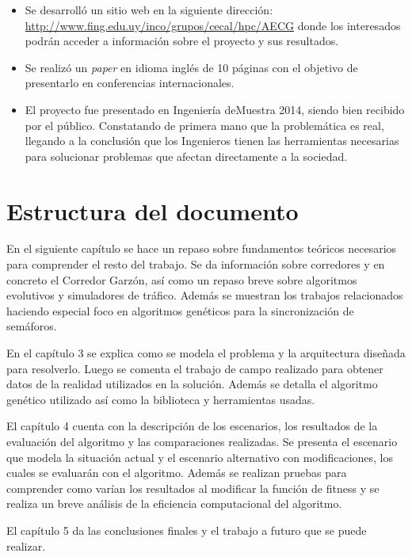 \begin{itemize}
	\item Se desarrolló un sitio web en la siguiente dirección: \url{http://www.fing.edu.uy/inco/grupos/cecal/hpc/AECG} donde los interesados podrán acceder a información sobre el proyecto y sus resultados. 
	\item Se realizó un \emph{paper} en idioma inglés de 10 páginas con el objetivo de presentarlo en conferencias internacionales.
	\item El proyecto fue presentado en Ingeniería deMuestra 2014, siendo bien recibido por el público. Constatando de primera mano que la problemática es real, llegando a la conclusión que los Ingenieros tienen las herramientas necesarias para solucionar problemas que afectan directamente a la sociedad.

\end{itemize}






\section{Estructura del documento}
En el siguiente capítulo se hace un repaso sobre fundamentos teóricos necesarios para comprender el resto del trabajo. Se da información sobre corredores y en concreto el Corredor Garzón, así como un repaso breve sobre algoritmos evolutivos y simuladores de tráfico. Además se muestran los trabajos relacionados haciendo especial foco en algoritmos genéticos para la sincronización de semáforos.

En el capítulo 3 se explica como se modela el problema y la arquitectura diseñada  para resolverlo. Luego se comenta el trabajo de campo realizado para obtener datos de la realidad utilizados en la solución. Además se detalla el algoritmo genético utilizado así como la biblioteca y herramientas usadas.

El capítulo 4 cuenta con la descripción de los escenarios, los resultados de la evaluación del algoritmo y las comparaciones realizadas. Se presenta el escenario que modela la situación actual y el escenario alternativo con modificaciones, los cuales se evaluarán con el algoritmo. Además se realizan pruebas para comprender como varían los resultados al modificar la función de fitness y se realiza un breve análisis de la eficiencia computacional del algoritmo.

El capítulo 5 da las conclusiones finales y el trabajo a futuro que se puede realizar.






